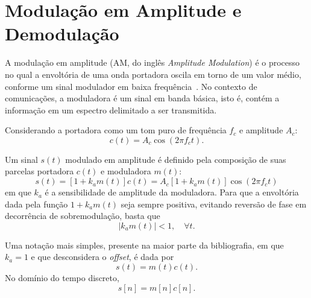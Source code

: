 \section{Modulação em Amplitude e Demodulação}
A modulação em amplitude (AM, do inglês \textit{Amplitude Modulation}) é o
processo no qual a envoltória de uma onda portadora oscila em torno de um valor
médio, conforme um sinal modulador em baixa frequência~\cite{haykin2008}. No
contexto de comunicações, a moduladora é um sinal em  banda básica, isto é,
contém a informação em um espectro delimitado a ser transmitida.

Considerando a portadora como um tom puro de frequência $f_c$ e amplitude $A_c$:
\begin{equation}
    c(t) = A_c \cos(2\pi f_c t).
\end{equation}

    Um sinal $s(t)$ modulado em amplitude é definido pela composição de
suas parcelas portadora $c(t)$ e moduladora $m(t)$:
\begin{equation}
    s(t) = [1+k_a m(t)]c(t) = A_c[1+k_a m(t)]\cos(2\pi f_c t)
\end{equation}
em que $k_a$ é a sensibilidade de amplitude da moduladora. Para que a envoltória
dada pela função $1+k_a m(t)$ seja sempre positiva, evitando reversão de fase
em decorrência de sobremodulação, basta que
\begin{equation}
    |k_a m(t)| < 1, \quad \forall t.
\end{equation}

Uma notação mais simples, presente na maior parte da 
bibliografia, em que $k_a = 1$ e que desconsidera o 
\textit{offset}, é dada por
\begin{equation}
    s(t) = m(t)c(t).
\end{equation}
No domínio do tempo discreto,
\begin{equation}
    s[n] = m[n]c[n]. 
\end{equation}
